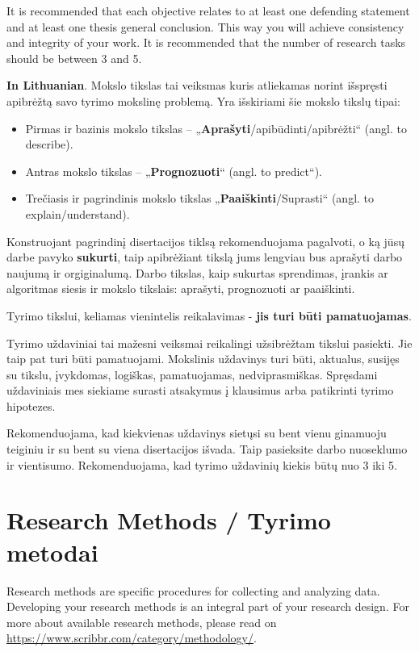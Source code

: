 It is recommended that each objective relates to at least one defending statement and at least one thesis general conclusion. This way you will achieve consistency and integrity of your work. It is recommended that the number of research tasks should be between 3 and 5.

\textbf{In Lithuanian}. 
Mokslo tikslas tai veiksmas kuris atliekamas norint išspręsti apibrėžtą savo tyrimo mokslinę problemą. 
Yra išskiriami šie mokslo tikslų tipai:
\begin{itemize}
    \item Pirmas ir bazinis mokslo tikslas – „\textbf{Aprašyti}/apibūdinti/apibrėžti“ (angl. to describe).
    \item Antras mokslo tikslas – „\textbf{Prognozuoti}“ (angl. to predict“).
    \item Trečiasis ir pagrindinis mokslo tikslas „\textbf{Paaiškinti}/Suprasti“ (angl. to explain/understand).
\end{itemize}

Konstruojant pagrindinį disertacijos tiklsą rekomenduojama pagalvoti, o ką jūsų darbe pavyko  \textbf{sukurti}, taip apibrėžiant tikslą jums lengviau bus aprašyti darbo naujumą ir orgiginalumą. Darbo tikslas, kaip sukurtas sprendimas, įrankis ar algoritmas siesis ir mokslo tikslais: aprašyti, prognozuoti ar paaiškinti.

Tyrimo tikslui, keliamas vienintelis reikalavimas - \textbf{jis turi būti pamatuojamas}.

Tyrimo uždaviniai tai mažesni veiksmai reikalingi užsibrėžtam tikslui pasiekti. Jie taip pat turi būti  pamatuojami. 
Mokslinis uždavinys turi būti, aktualus, susijęs su tikslu, įvykdomas, logiškas, pamatuojamas, nedviprasmiškas.
Spręsdami uždaviniais mes siekiame surasti atsakymus į klausimus arba patikrinti tyrimo hipotezes.

Rekomenduojama, kad kiekvienas uždavinys sietųsi su bent vienu ginamuoju teiginiu ir su bent su viena disertacijos išvada. Taip pasieksite darbo nuoseklumo ir vientisumo. Rekomenduojama, kad tyrimo uždavinių kiekis būtų nuo  3 iki 5.

\section*{Research Methods / Tyrimo metodai}

Research methods are specific procedures for collecting and analyzing data. Developing your research methods is an integral part of your research design. For more about available research methods, please read on \url{https://www.scribbr.com/category/methodology/}.

